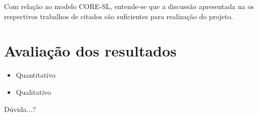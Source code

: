 Com relação ao modelo CORE-SL, entende-se que a discussão apresentada na  os respectivos trabalhos de citados são suficientes para realização do projeto.

\section{Avaliação dos resultados}

\begin{itemize}
\item Quantitativo
\item Qualitativo
\end{itemize}

Dúvida...?


\printbibliography


